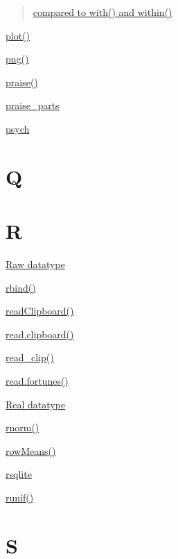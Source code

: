 \documentclass[]{book}
\begin{document}
\begin{quote}
\href{https://linkedin-learning.pxf.io/rweekly_with}{compared to with() and within()}
\end{quote}

\href{https://linkedin-learning.pxf.io/plot}{plot()}

\href{linkedin-learning.pxf.io/rweekly_plottofile}{png()}

\href{https://linkedin-learning.pxf.io/rweekly_fun}{praise()}

\href{https://linkedin-learning.pxf.io/rweekly_fun}{praise\_parts}

\href{https://linkedin-learning.pxf.io/rweekly_clipboard}{psych}

\hypertarget{q}{%
\chapter*{Q}\label{q}}

\hypertarget{r}{%
\chapter*{R}\label{r}}

\href{https://linkedin-learning.pxf.io/rweekly_atomics}{Raw datatype}

\href{https://linkedin-learning.pxf.io/rbind}{rbind()}

\href{https://linkedin-learning.pxf.io/rweekly_clipboard}{readClipboard()}

\href{https://linkedin-learning.pxf.io/rweekly_clipboard}{read.clipboard()}

\href{https://linkedin-learning.pxf.io/rweekly_clipboard}{read\_clip()}

\href{https://linkedin-learning.pxf.io/rweekly_fun}{read.fortunes()}

\href{https://linkedin-learning.pxf.io/rweekly_atomics}{Real datatype}

\href{https://linkedin-learning.pxf.io/rweekly_random}{rnorm()}

\href{https://linkedin-learning.pxf.io/rweekly_colmeans}{rowMeans()}

\href{https://linkedin-learning.pxf.io/rweekly_rsqlite}{rsqlite}

\href{https://linkedin-learning.pxf.io/rweekly_random}{runif()}

\hypertarget{s}{%
\chapter*{S}\label{s}}
\end{document}
